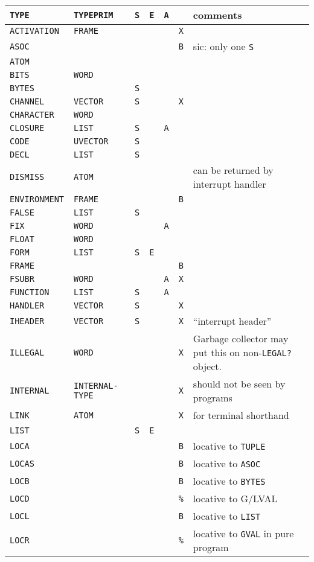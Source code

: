 \documentclass[a4paper,]{article}
\begin{document}
\begin{longtable}[]{@{}lllllll@{}}
\toprule
\texttt{TYPE} & \texttt{TYPEPRIM} & \texttt{S} & \texttt{E} & \texttt{A} & & comments\tabularnewline
\midrule
\endhead
\texttt{ACTIVATION} & \texttt{FRAME} & & & & \texttt{X} &\tabularnewline
\texttt{ASOC} & & & & & \texttt{B} & sic: only one \texttt{S}\tabularnewline
\texttt{ATOM} & & & & & &\tabularnewline
\texttt{BITS} & \texttt{WORD} & & & & &\tabularnewline
\texttt{BYTES} & & \texttt{S} & & & &\tabularnewline
\texttt{CHANNEL} & \texttt{VECTOR} & \texttt{S} & & & \texttt{X} &\tabularnewline
\texttt{CHARACTER} & \texttt{WORD} & & & & &\tabularnewline
\texttt{CLOSURE} & \texttt{LIST} & \texttt{S} & & \texttt{A} & &\tabularnewline
\texttt{CODE} & \texttt{UVECTOR} & \texttt{S} & & & &\tabularnewline
\texttt{DECL} & \texttt{LIST} & \texttt{S} & & & &\tabularnewline
\texttt{DISMISS} & \texttt{ATOM} & & & & & can be returned by interrupt handler\tabularnewline
\texttt{ENVIRONMENT} & \texttt{FRAME} & & & & \texttt{B} &\tabularnewline
\texttt{FALSE} & \texttt{LIST} & \texttt{S} & & & &\tabularnewline
\texttt{FIX} & \texttt{WORD} & & & \texttt{A} & &\tabularnewline
\texttt{FLOAT} & \texttt{WORD} & & & & &\tabularnewline
\texttt{FORM} & \texttt{LIST} & \texttt{S} & \texttt{E} & & &\tabularnewline
\texttt{FRAME} & & & & & \texttt{B} &\tabularnewline
\texttt{FSUBR} & \texttt{WORD} & & & \texttt{A} & \texttt{X} &\tabularnewline
\texttt{FUNCTION} & \texttt{LIST} & \texttt{S} & & \texttt{A} & &\tabularnewline
\texttt{HANDLER} & \texttt{VECTOR} & \texttt{S} & & & \texttt{X} &\tabularnewline
\texttt{IHEADER} & \texttt{VECTOR} & \texttt{S} & & & \texttt{X} & ``interrupt header''\tabularnewline
\texttt{ILLEGAL} & \texttt{WORD} & & & & \texttt{X} & Garbage collector may put this on non-\texttt{LEGAL?}
object.\tabularnewline
\texttt{INTERNAL}\index{\texttt{INTERNAL}} & \texttt{INTERNAL-TYPE}\index{\texttt{INTERNAL-TYPE}} & & & & \texttt{X} &
should not be seen by programs\tabularnewline
\texttt{LINK} & \texttt{ATOM} & & & & \texttt{X} & for terminal shorthand\tabularnewline
\texttt{LIST} & & \texttt{S} & \texttt{E} & & &\tabularnewline
\texttt{LOCA} & & & & & \texttt{B} & locative to \texttt{TUPLE}\tabularnewline
\texttt{LOCAS} & & & & & \texttt{B} & locative to \texttt{ASOC}\tabularnewline
\texttt{LOCB} & & & & & \texttt{B} & locative to \texttt{BYTES}\tabularnewline
\texttt{LOCD} & & & & & \texttt{\%} & locative to G/LVAL\tabularnewline
\texttt{LOCL} & & & & & \texttt{B} & locative to \texttt{LIST}\tabularnewline
\texttt{LOCR} & & & & & \texttt{\%} & locative to \texttt{GVAL} in pure program\tabularnewline

\end{longtable}
\end{document}
